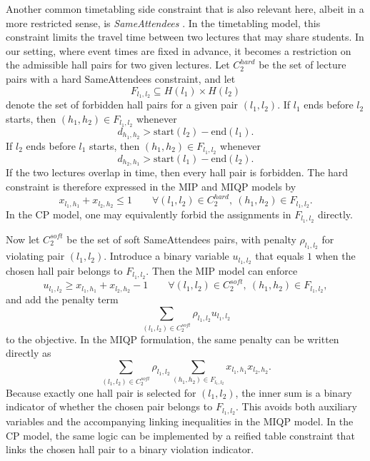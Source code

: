 \documentclass[11pt]{article}
\begin{document}
Another common timetabling side constraint that is also relevant here, albeit in a more restricted sense, is \emph{SameAttendees} \citep{muller2025itc2019}. In the timetabling model, this constraint limits the travel time between two lectures that may share students. In our setting, where event times are fixed in advance, it becomes a restriction on the admissible hall pairs for two given lectures. Let $C_2^{hard}$ be the set of lecture pairs with a hard SameAttendees constraint, and let
\[
F_{l_1,l_2} \subseteq H(l_1)\times H(l_2)
\]
denote the set of forbidden hall pairs for a given pair $(l_1,l_2)$. If $l_1$ ends before $l_2$ starts, then $(h_1,h_2)\in F_{l_1,l_2}$ whenever
\[
d_{h_1,h_2} > \text{start}(l_2)-\text{end}(l_1).
\]
If $l_2$ ends before $l_1$ starts, then $(h_1,h_2)\in F_{l_1,l_2}$ whenever
\[
d_{h_2,h_1} > \text{start}(l_1)-\text{end}(l_2).
\]
If the two lectures overlap in time, then every hall pair is forbidden. The hard constraint is therefore expressed in the MIP and MIQP models by
\begin{equation}
	\label{eq:hard-SameAttendees}
	x_{l_1,h_1}+x_{l_2,h_2} \le 1 \qquad \forall (l_1,l_2)\in C_2^{hard},\ (h_1,h_2)\in F_{l_1,l_2}.
\end{equation}
In the CP model, one may equivalently forbid the assignments in $F_{l_1,l_2}$ directly.

Now let $C_2^{soft}$ be the set of soft SameAttendees pairs, with penalty $\rho_{l_1,l_2}$ for violating pair $(l_1,l_2)$. Introduce a binary variable $u_{l_1,l_2}$ that equals $1$ when the chosen hall pair belongs to $F_{l_1,l_2}$. Then the MIP model can enforce
\begin{equation}
	\label{eq:soft-SameAttendees}
	u_{l_1,l_2} \ge x_{l_1,h_1}+x_{l_2,h_2}-1
	\qquad \forall (l_1,l_2)\in C_2^{soft},\ (h_1,h_2)\in F_{l_1,l_2},
\end{equation}
and add the penalty term
\[
\sum_{(l_1,l_2)\in C_2^{soft}} \rho_{l_1,l_2} u_{l_1,l_2}
\]
to the objective. In the MIQP formulation, the same penalty can be written directly as
\[
\sum_{(l_1,l_2)\in C_2^{soft}} \rho_{l_1,l_2}
\sum_{(h_1,h_2)\in F_{l_1,l_2}} x_{l_1,h_1}x_{l_2,h_2}.
\]
Because exactly one hall pair is selected for $(l_1,l_2)$, the inner sum is a binary indicator of whether the chosen pair belongs to $F_{l_1,l_2}$. This avoids both auxiliary variables and the accompanying linking inequalities in the MIQP model. In the CP model, the same logic can be implemented by a reified table constraint that links the chosen hall pair to a binary violation indicator.
\end{document}
